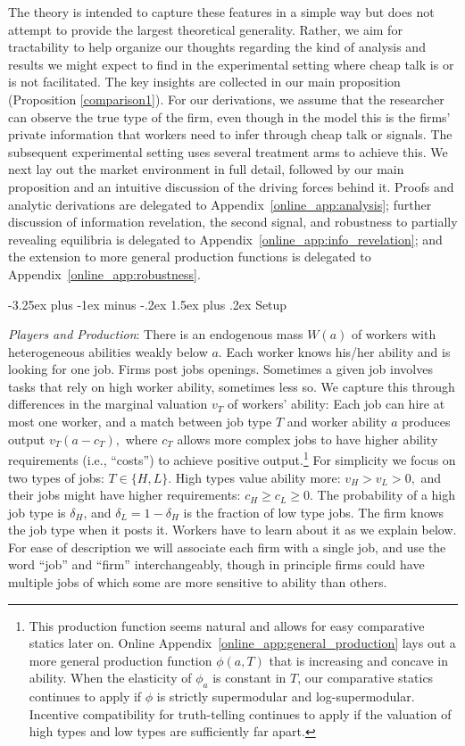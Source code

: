 \documentclass[12pt]{article}
\makeatletter
\renewcommand{\subsection}{%
  \@startsection{subsection}{2}{\z@}%
  {-3.25ex plus -1ex minus -.2ex}%
  {1.5ex plus .2ex}%
  {\normalfont\large\bfseries}%
}
\makeatother
\begin{document}
The theory is intended to capture these features in a simple way but does not attempt to provide the largest theoretical generality.
Rather, we aim for tractability to help organize our thoughts regarding the kind of analysis and results we might expect to find in the experimental setting where cheap talk is or is not facilitated. The key insights are collected in our main proposition (Proposition \ref{comparison1}). For our derivations, we assume that the researcher can observe the true type of the firm, even though in the model this is the firms' private information that workers need to infer through cheap talk or signals. The subsequent experimental setting uses several treatment arms to achieve this. We next lay out the market environment in full detail, followed by our main proposition and an intuitive discussion of the driving forces behind it. Proofs and analytic derivations are delegated to Appendix~\ref{online_app:analysis}; further discussion of information revelation, the second signal, and robustness to partially revealing equilibria is delegated to Appendix~\ref{online_app:info_revelation}; and the extension to more general production functions is delegated to Appendix~\ref{online_app:robustness}.

\subsection{Setup}\label{sec:setup}

\textit{Players and Production}: There is an endogenous mass $W(a)$ of workers
with heterogeneous abilities weakly below $a$. Each worker knows his/her ability and is looking for one job. Firms post jobs openings. Sometimes a given job involves tasks that rely on high worker ability, sometimes less so. We capture this through differences in the marginal valuation $v_{T}$ of workers' ability: Each job can hire at most one
worker, and a match between job type $T$ and worker ability $a$ produces
output $v_{T}(a-c_{T}),$ where $c_{T}$ allows more complex jobs to have higher ability requirements (i.e., ``costs'') to achieve positive output.\footnote{This production function seems natural and allows for easy comparative statics later on. Online Appendix~\ref{online_app:general_production} lays out a more general production function $\phi(a,T)$ that is increasing and concave in ability. When the elasticity of $\phi_a$ is constant in $T$, our comparative statics continues to apply if $\phi$ is strictly supermodular and log-supermodular. Incentive compatibility for truth-telling continues to apply if the valuation of high types and low types are sufficiently far apart.}
For simplicity we focus on two types of jobs: $T\in \{H,L\}.$ High types value
ability more: $v_{H}>v_{L}>0,$ and their jobs might have higher requirements: $%
c_{H}\geq c_{L}\geq 0$. The probability of a high job type is $\delta _{H}$, and $\delta_L = 1-\delta_H$ is the fraction of low type jobs. The firm knows the job type when it posts it. Workers have to learn about it as we explain below. For ease of description we will associate each firm with a single job, and use the word ``job'' and ``firm'' interchangeably, though in principle firms could have multiple jobs of which some are more sensitive to ability than others.
\end{document}
